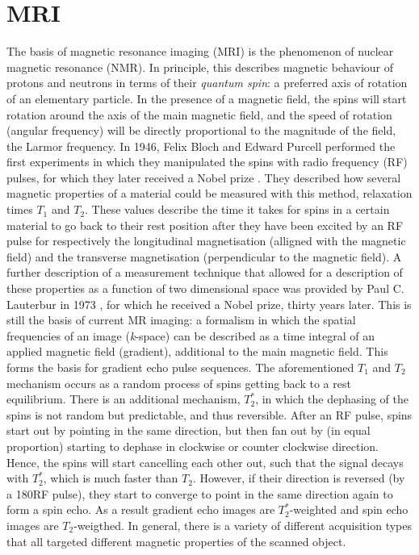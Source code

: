 \section*{MRI}
The basis of magnetic resonance imaging (MRI) is the phenomenon of nuclear magnetic resonance (NMR). In principle, this describes magnetic behaviour of protons and neutrons in terms of their \emph{quantum spin}: a preferred axis of rotation of an elementary particle. In the presence of a magnetic field, the spins will start rotation around the axis of the main magnetic field, and the speed of rotation (angular frequency) will be directly proportional to the magnitude of the field, the Larmor frequency. In 1946, Felix Bloch and Edward Purcell performed the first experiments in which they manipulated the spins with radio frequency (RF) pulses, for which they later received a Nobel prize \cite{Bloch1946}. They described how several magnetic properties of a material could be measured with this method, relaxation times $T_1$ and $T_2$.
These values describe the time it takes for spins in a certain material to go back to their rest position after they have been excited by an RF pulse for respectively the longitudinal magnetisation (alligned with the magnetic field) and the transverse magnetisation (perpendicular to the magnetic field). 
A further description of a measurement technique that allowed for a description of these properties as a function of two dimensional space was provided by Paul C. Lauterbur in 1973 \cite{Lauterbur1973}, for which he received a Nobel prize, thirty years later. This is still the basis of current MR imaging: a formalism in which the spatial frequencies of an image (\emph{k}-space) can be described as a time integral of an applied magnetic field (gradient), additional to the main magnetic field. This forms the basis for gradient echo pulse sequences. 
The aforementioned $T_1$ and $T_2$ mechanism occurs as a random process of spins getting back to a rest equilibrium. There is an additional mechanism, $T_2^*$, in which the dephasing of the spins is not random but predictable, and thus reversible. After an RF pulse, spins start out by pointing in the same direction, but then fan out by (in equal proportion) starting to dephase in clockwise or counter clockwise direction. Hence, the spins will start cancelling each other out, such that the signal decays with $T_2^*$, which is much faster than $T_2$. However, if their direction is reversed (by a 180\textdegree RF pulse), they start to converge to point in the same direction again to form a spin echo. As a result gradient echo images are $T_2^*$-weighted and spin echo images are $T_2$-weigthed. In general, there is a variety of different acquisition types that all targeted different magnetic properties of the scanned object. 

